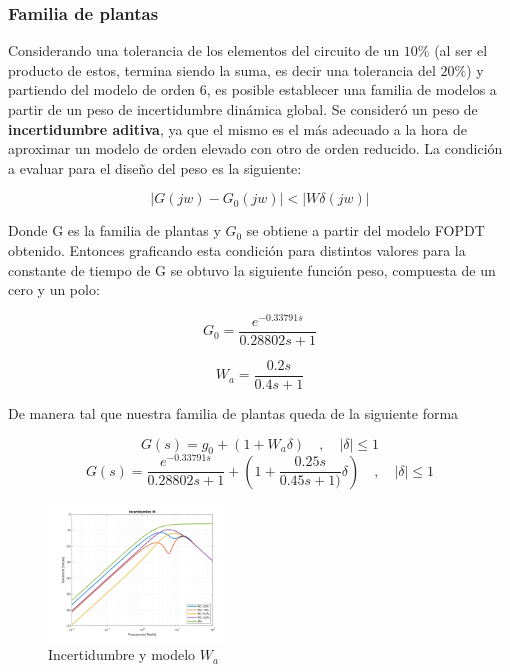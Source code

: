 \documentclass[letterpaper, 10 pt, conference]{ieeeconf}  %
\begin{document}
\subsubsection{Familia de plantas}

Considerando una tolerancia de los elementos del circuito de un $10\%$ (al ser el producto de estos, termina siendo la suma, es decir una tolerancia del $20\%$) y partiendo del modelo de orden 6, es posible establecer una familia de modelos a partir de un peso de incertidumbre dinámica global. Se consideró un peso de \textbf{incertidumbre aditiva}, ya que el mismo es el más adecuado a la hora de aproximar un modelo de orden elevado con otro de orden reducido. La condición a evaluar para el diseño del peso es la siguiente:

\begin{equation*}
  |G(jw) - G_0(jw)| < |W\delta(jw)|
\end{equation*}

Donde G es la familia de plantas y $G_0$ se obtiene a partir del modelo FOPDT obtenido. Entonces graficando esta condición para distintos valores para la constante de tiempo de G se obtuvo la siguiente función peso, compuesta de un cero y un polo:

\begin{equation*}
  G_0 = \frac{e^{-0.33791s}}{0.28802s+1}
\end{equation*}

\begin{equation*}
  W_a = \frac{0.2s}{0.4s+1}
\end{equation*}

De manera tal que nuestra familia de plantas queda de la siguiente forma

\begin{equation*}
  G(s) = g_0 + (1 + W_{a}\delta)  \hspace{1em},\hspace{1em} |\delta| \leq 1
\end{equation*}
\begin{equation*}
  G(s) = \frac{e^{-0.33791s}}{0.28802s+1} + (1 + \frac{0.25s}{0.45s+1)}\delta) \hspace{1em},\hspace{1em} |\delta| \leq 1
\end{equation*}

\begin{figure}[H]
  \centering
  \includegraphics[width=0.43\textwidth]{./IMAGENES/wa.png}
  \caption{Incertidumbre y modelo $W_a$}
  \label{fig:incertidumbres}
\end{figure}
\end{document}
